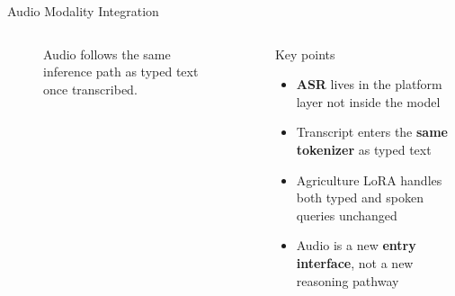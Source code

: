 \documentclass[aspectratio=169,11pt]{beamer}
\begin{document}
\begin{frame}{Audio Modality Integration}
\begin{columns}[T]
\begin{figure}
{\begin{tikzpicture}
    \end{tikzpicture}
    }%
    \caption{\footnotesize Audio follows the same inference path as typed text once transcribed.}
    \end{figure}

    \vspace{0.4em}
    \begin{block}{Key points}
    \begin{itemize}
        \item \textbf{ASR} lives in the platform layer not inside the model
        \item Transcript enters the \textbf{same tokenizer} as typed text
        \item Agriculture LoRA handles both typed and spoken queries unchanged
        \item Audio is a new \textbf{entry interface}, not a new reasoning pathway
    \end{itemize}
    \end{block}

\end{columns}
\end{frame}
\end{document}
